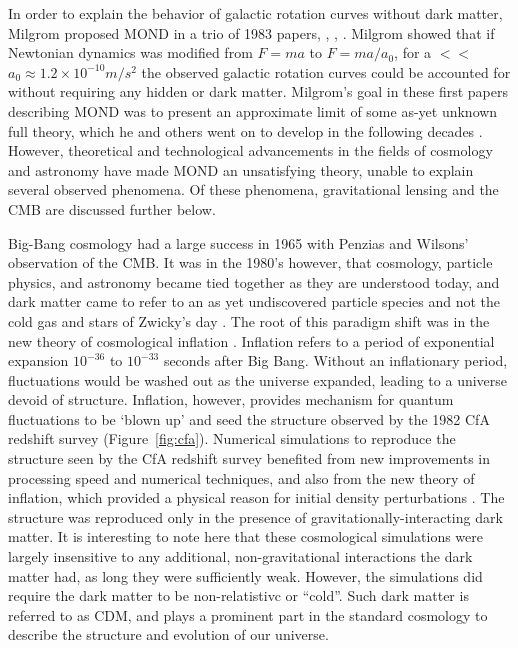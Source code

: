 In order to explain the behavior of galactic rotation curves without dark matter, Milgrom proposed \ac{MOND} in a trio of 1983 papers, \cite{Milgrom1983_1}, \cite{Milgrom1983_2}, \cite{Milgrom1983_3}. Milgrom showed that if Newtonian dynamics was modified from $F = ma$ to $F= ma / a_{0}$, for a $<<$ $a_{0} \approx 1.2 \times 10^{-10} m/s^{2}$ the observed galactic rotation curves could be accounted for without requiring any hidden or dark matter. Milgrom's goal in these first papers describing \ac{MOND} was to present an approximate limit of some as-yet unknown full theory, which he and others went on to develop in the following decades \cite{Bertone2016}. However, theoretical and technological advancements in the fields of cosmology and astronomy have made \ac{MOND} an unsatisfying theory, unable to explain several observed phenomena. Of these phenomena, gravitational lensing and the \ac{CMB} are discussed further below.

Big-Bang cosmology had a large success in 1965 with Penzias and Wilsons' observation of the \ac{CMB}. It was in the 1980's however, that cosmology, particle physics, and astronomy became tied together as they are understood today, and dark matter came to refer to an as yet undiscovered particle species and not the cold gas and stars of Zwicky's day \cite{Bertone2016}. The root of this paradigm shift was in the new theory of cosmological inflation \cite{Bertone2016}. Inflation refers to a period of exponential expansion $10^{-36}$ to $10^{-33}$ seconds after Big Bang. Without an inflationary period, fluctuations would be washed out as the universe expanded, leading to a universe devoid of structure. Inflation, however, provides mechanism for quantum fluctuations to be `blown up' and seed the structure observed by the 1982 CfA redshift survey (Figure~\ref{fig:cfa}). Numerical simulations to reproduce the structure seen by the CfA redshift survey benefited from new improvements in processing speed and numerical techniques, and also from the new theory of inflation, which provided a physical reason for initial density perturbations \cite{Bertone2016}. The structure was reproduced only in the presence of gravitationally-interacting dark matter. It is interesting to note here that these cosmological simulations were largely insensitive to any additional, non-gravitational interactions the dark matter had, as long they were sufficiently weak. However, the simulations did require the dark matter to be non-relatistivc or ``cold''. Such dark matter is referred to as \ac{CDM}, and plays a prominent part in the standard cosmology to describe the structure and evolution of our universe.  

